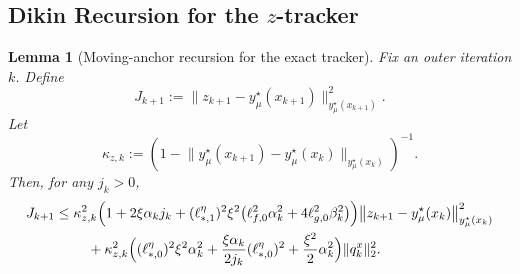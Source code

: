 \documentclass{article}
\newtheorem{lemma}{Lemma}
\begin{document}
\subsection{Dikin Recursion for the \(z\)-tracker}

\begin{lemma}[Moving-anchor recursion for the exact tracker]
\label{lem:z_moving_anchor_recursion}
Fix an outer iteration \(k\). Define
\[
J_{k+1}
:=
\big\|z_{k+1}-y_\mu^\star(x_{k+1})\big\|_{y_\mu^\star(x_{k+1})}^2 .
\]
Let
\[
\kappa_{z,k}
:=
\left(
1-
\big\|y_\mu^\star(x_{k+1})-y_\mu^\star(x_k)\big\|_{y_\mu^\star(x_k)}
\right)^{-1}.
\]
Then, for any \(j_k>0\),
\begin{align}
J_{k+1}
\le\;&
\kappa_{z,k}^2
\Bigl(
1
+
2\xi\alpha_k j_k
+
(\ell_{*,1}^\eta)^2\xi^2
\bigl(\ell_{f,0}^2\alpha_k^2+4\ell_{g,0}^2\beta_k^2\bigr)
\Bigr)
\big\|z_{k+1}-y_\mu^\star(x_k)\big\|_{y_\mu^\star(x_k)}^2
\nonumber\\
&\quad
+
\kappa_{z,k}^2
\Bigl(
(\ell_{*,0}^\eta)^2\xi^2\alpha_k^2
+
\frac{\xi\alpha_k}{2j_k}(\ell_{*,0}^\eta)^2
+
\frac{\xi^2}{2}\alpha_k^2
\Bigr)
\|q_k^x\|_2^2 .
\label{eq:exact_moving_anchor_raw}
\end{align}
\end{lemma}
\end{document}

